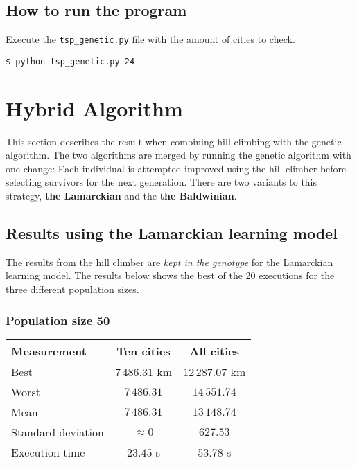 \documentclass{article}
\begin{document}
\subsection*{How to run the program}

Execute the \texttt{tsp\_genetic.py} file with the amount of cities to check.

\begin{verbatim}
$ python tsp_genetic.py 24
\end{verbatim}

\section*{Hybrid Algorithm}

This section describes the result when combining hill climbing with the genetic algorithm. The two algorithms are merged by running the genetic algorithm with one change: Each individual is attempted improved using the hill climber before selecting survivors for the next generation. There are two variants to this strategy, \textbf{the Lamarckian} and the \textbf{the Baldwinian}.

\subsection*{Results using the Lamarckian learning model}

The results from the hill climber are \textit{kept in the genotype} for the Lamarckian learning model. The results below shows the best of the 20 executions for the three different population sizes.

\subsubsection*{Population size 50}

\begin{center}
\begin{tabular}{lcc}
\toprule
Measurement & Ten cities & All cities \\
\midrule
Best & $7\,486.31$ km & $12\,287.07$ km \\
Worst & $7\,486.31$ & $14\,551.74$ \\
Mean & $7\,486.31$ & $13\,148.74$ \\
Standard deviation & $\approx 0$ & $627.53$ \\
Execution time & $23.45$ s & $53.78$ s \\
\bottomrule
\end{tabular}
\end{center}
\end{document}
